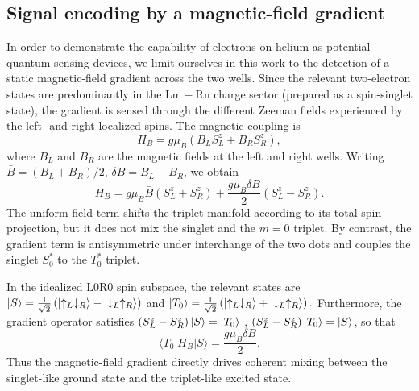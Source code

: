 \documentclass[fleqn,10pt]{wlscirep}
\begin{document}
\subsection{Signal encoding by a magnetic-field gradient}
\label{sec:signal_encoding}

In order to demonstrate the capability of electrons on helium as potential quantum sensing devices, we limit ourselves in this work to the detection of a static magnetic-field gradient across the two wells. Since the relevant two-electron states are predominantly in the $\mathrm{L\textrm{m}}-\mathrm{R\textrm{n}}$ charge sector (prepared as a spin-singlet state), the gradient is sensed through the different Zeeman fields experienced by the left- and right-localized spins.  The magnetic
coupling is
\begin{equation}
  H_B
  =
  g\mu_B
  \left(
  B_L S^z_L + B_R S^z_R
  \right),
  \label{eq:HB_local}
\end{equation}
where $B_L$ and $B_R$ are the magnetic fields at the left and right wells.  Writing $\bar B = \left(B_L+B_R\right)/2$, $ \delta B = B_L-B_R$,
we obtain
\begin{equation}
  H_B
  =
  g\mu_B \bar B
  \left(S^z_L+S^z_R\right)
  +
  \frac{g\mu_B\delta B}{2}
  \left(S^z_L-S^z_R\right).
  \label{eq:HB_uniform_gradient}
\end{equation}
The uniform field term shifts the triplet manifold according to its total spin projection, but it does not mix the singlet and the $m=0$ triplet.  By contrast, the gradient term is antisymmetric under interchange of the two dots and couples the singlet $S_0^*$ to the $T^*_0$ triplet.

In the idealized $\mathrm{L0}\mathrm{R0}$ spin subspace, the relevant states are
$
  \ket{S} =
  \frac{1}{\sqrt{2}}
  \left(
  \ket{\uparrow_L\downarrow_R}
  -
  \ket{\downarrow_L\uparrow_R}
  \right)
  $ and $
  \ket{T_0}=
  \frac{1}{\sqrt{2}}
  \left(
\ket{\uparrow_L\downarrow_R}
  +
 \ket{\downarrow_L\uparrow_R}
  \right).$
Furthermore, the gradient operator satisfies
$ \left(S^z_L-S^z_R\right)\ket{S} = \ket{T_0}$ ,
$ \left(S^z_L-S^z_R\right)\ket{T_0} = \ket{S}$,
so that
\begin{equation}
  \langle T_0|H_B|S\rangle
  =
  \frac{g\mu_B\delta B}{2}.
  \label{eq:ST_gradient_coupling}
\end{equation}
Thus the magnetic-field gradient directly drives coherent mixing between the
singlet-like ground state and the triplet-like excited state.
\end{document}

